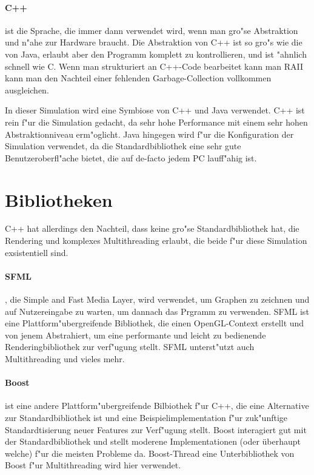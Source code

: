 \documentclass[14pt, a4paper]{report}
\begin{document}
\paragraph{C++} ist die Sprache, die immer dann verwendet wird, wenn man gro"se 
Abstraktion und n"ahe zur Hardware braucht. Die Abstraktion von C++ ist so gro"s wie die
von Java, erlaubt aber den Programm komplett zu kontrollieren, und ist "ahnlich schnell
wie C. Wenn man strukturiert an C++-Code bearbeitet kann man RAII  kann man den Nachteil einer fehlenden 
Garbage-Collection vollkommen ausgleichen.

In dieser Simulation wird eine Symbiose von C++ und Java verwendet. C++ ist rein f"ur 
die Simulation gedacht, da sehr hohe Performance mit einem sehr hohen Abstraktionniveau erm"oglicht. Java hingegen wird f"ur die Konfiguration der Simulation verwendet, da die
Standardbibliothek eine sehr gute Benutzeroberfl"ache bietet, die auf de-facto jedem
PC lauff"ahig ist.

\section{Bibliotheken}
C++ hat allerdings den Nachteil, dass keine gro"se Standardbibliothek hat, die Rendering
und komplexes Multithreading erlaubt, die beide f"ur diese Simulation exsistentiell 
sind. 

\paragraph{SFML}, die Simple and Fast Media Layer, wird verwendet, um Graphen zu 
zeichnen und auf Nutzereingabe zu warten, um dannach das Prgramm zu verwenden. SFML
ist eine Plattform"ubergreifende Bibliothek, die einen OpenGL-Context erstellt und von
jenem Abstrahiert, um eine performante und leicht zu bedienende Renderingbibliothek zur
verf"ugung stellt. SFML unterst"utzt auch Multithreading und vieles mehr.

\paragraph{Boost} ist eine andere Plattform"ubergreifende Bilbiothek f"ur C++, die eine
Alternative zur Standardbibliothek ist und eine Beispielimplementation f"ur zuk"unftige 
Standardtisierung neuer Features zur Verf"ugung stellt. Boost interagiert gut mit der 
Standardbibliothek und stellt moderene Implementationen (oder überhaupt welche) f"ur
die meisten Probleme da. Boost-Thread eine Unterbibliothek von Boost f"ur Multithreading
wird hier verwendet.
\end{document}
